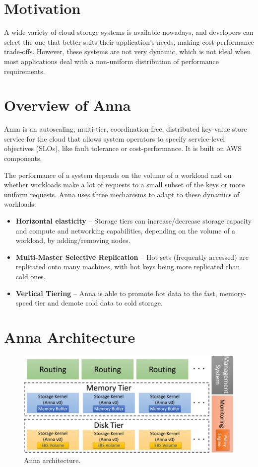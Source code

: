 \documentclass[14pt,oneside]{extreport}
\newcommand*\fpar{\hspace{1ex}}
\begin{document}
  \section{Motivation}
  \fpar A wide variety of cloud-storage systems is available nowadays, and developers can select the one that better suits their application’s needs, making cost-performance trade-offs. However, these systems are not very dynamic, which is not ideal when most applications deal with a non-uniform distribution of performance requirements.

  \section{Overview of Anna}
  \fpar Anna is an autoscaling, multi-tier, coordination-free, distributed key-value store service for the cloud that allows system operators to specify service-level objectives (SLOs), like fault tolerance or cost-performance. It is built on AWS components.
  \par The performance of a system depends on the volume of a workload and on whether workloads make a lot of requests to a small subset of the keys or more uniform requests. Anna uses three mechanisms to adapt to these dynamics of workloads:
  \begin{itemize}[noitemsep]
    \item \textbf{Horizontal elasticity} – Storage tiers can increase/decrease storage capacity and compute and networking capabilities, depending on the volume of a workload, by adding/removing nodes.
    \item \textbf{Multi-Master Selective Replication} – Hot sets (frequently accessed) are replicated onto many machines, with hot keys being more replicated than cold ones.
    \item \textbf{Vertical Tiering} – Anna is able to promote hot data to the fast, memory-speed tier and demote cold data to cold storage.
  \end{itemize}

  \section{Anna Architecture}
  
  \begin{figure}[htbp]
    \centerline{\includegraphics[scale=0.5]{images/paper2/architecture.png}}
    \caption{Anna architecture.}
    \label{fig}
  \end{figure}
\end{document}
